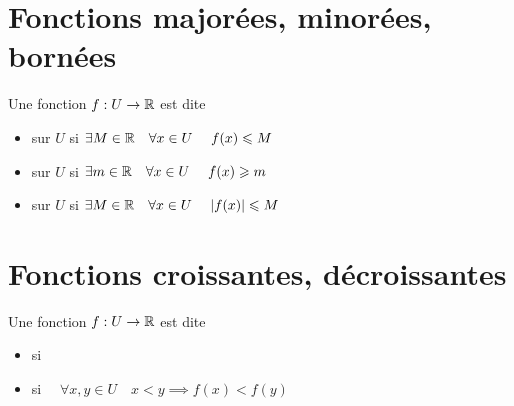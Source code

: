 \section{Fonctions majorées, minorées, bornées}

\begin{frame}

\begin{mydefinition}
Une fonction $f:U\to \mathbb{R}$ est dite
\begin{itemize}
  \item {} sur $U$ si \quad $\exists M\in\mathbb{R} \quad \forall x\in U \quad \ f(x)\leqslant M$ 
\pause
  \item {} sur $U$ si \quad $\exists m\in\mathbb{R} \quad \forall x\in U \quad \ f(x)\geqslant m$ 
\pause
  \item {} sur $U$ si \quad $\exists M\in\mathbb{R} \quad \forall x\in U \quad \ |f(x)|\leqslant M$
\end{itemize}
\end{mydefinition}
 
 \pause
 
  
\end{frame}



\section{Fonctions croissantes, décroissantes}

\begin{frame}  
\begin{mydefinition}
Une fonction $f:U\to \mathbb{R}$ est dite
\medskip
\begin{itemize}
  \item {} si 
  
  \medskip
  
\pause  \pause 
  
  \item {} si \ \ 
  $\forall x,y\in U \quad  x< y \implies f(x)< f(y)$
\end{itemize}
\end{mydefinition}

  
\end{frame}

